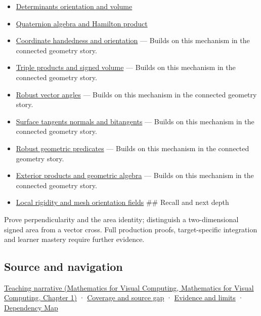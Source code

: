 \begin{itemize}
\item
  \hyperref[appendix-da478be01d02]{Determinants orientation and volume}
\item
  \hyperref[appendix-965d9260eeab]{Quaternion algebra and Hamilton product}
\item
  \hyperref[appendix-87d7626c8d37]{Coordinate handedness and orientation} --- Builds on this mechanism in the connected geometry story.
\item
  \hyperref[appendix-5caa058bd9c7]{Triple products and signed volume} --- Builds on this mechanism in the connected geometry story.
\item
  \hyperref[appendix-e569e60e18e6]{Robust vector angles} --- Builds on this mechanism in the connected geometry story.
\item
  \hyperref[appendix-e31893dec985]{Surface tangents normals and bitangents} --- Builds on this mechanism in the connected geometry story.
\item
  \hyperref[appendix-341296fb3f64]{Robust geometric predicates} --- Builds on this mechanism in the connected geometry story.
\item
  \hyperref[appendix-e1960925d1b8]{Exterior products and geometric algebra} --- Builds on this mechanism in the connected geometry story.
\item
  \hyperref[appendix-7107009c505b]{Local rigidity and mesh orientation fields} \#\# Recall and next depth
\end{itemize}

Prove perpendicularity and the area identity; distinguish a two-dimensional signed area from a vector cross. Full production proofs, target-specific integration and learner mastery require further evidence.

\subsection{Source and navigation}\label{appendix-2391db8052b1-source-and-navigation}

\href{../02-Mathematics-for-Visual-Computing/main.pdf\#nameddest=01-foundations-i-ch017-oriented-area-tells-us-which-side-of-the-panel-is-front}{Teaching narrative (Mathematics for Visual Computing, Mathematics for Visual Computing, Chapter 1)} · \hyperref[appendix-fd090d982a15-phase-6---parts-501-600]{Coverage and source gap} · \hyperref[appendix-a103e7846d21-phase-6---source-analysis-and-verification]{Evidence and limits} · \hyperref[appendix-4ad47bdd269a]{Dependency Map}
